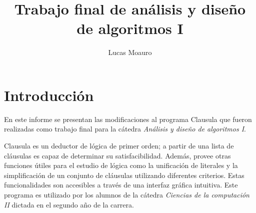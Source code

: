 \documentclass[a4paper,12pt]{article}
\title{Trabajo final de análisis y diseño de algoritmos I}
\author{Lucas Moauro}
\date{}
\begin{document}
\maketitle
\newpage
\tableofcontents
\section{Introducción}
En este informe se presentan las modificaciones al programa Clausula que fueron realizadas como trabajo final
para la cátedra \emph{Análisis y diseño de algoritmos I}.

Clausula \cite{Clausula} es un deductor de lógica de primer orden; a partir de una lista de cláusulas es capaz
de determinar su satisfacibilidad. Además, provee otras funciones útiles para el estudio de lógica como la
unificación de literales y la simplificación de un conjunto de cláusulas utilizando diferentes criterios. Estas funcionalidades
son accesibles a través de una interfaz gráfica intuitiva. Este programa es utilizado por los alumnos de la cátedra \emph{Ciencias de la
computación II} dictada en el segundo año de la carrera.
\end{document}
